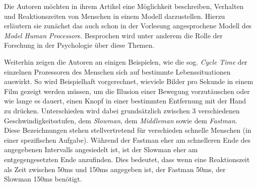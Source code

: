 \documentclass[a4paper,10pt]{article}
\begin{document}
\kopf
\renewcommand{\figurename}{Figure}

Die Autoren möchten in ihrem Artikel eine Möglichkeit beschreiben, Verhalten und Reaktionszeiten von Menschen in einem Modell darzustellen. Hierzu erläutern sie zunächst das auch schon in der Vorlesung angesprochene Modell des \textit{Model Human Processor}s. Besprochen wird unter anderem die Rolle der Forschung in der Psychologie über diese Themen.

Weiterhin zeigen die Autoren an einigen Beispielen, wie die sog. \textit{Cycle Time} der einzelnen Prozessoren des Menschen sich auf bestimmte Lebenssituationen auswirkt. So wird Beispielhaft vorgerechnet, wieviele Bilder pro Sekunde in einem Film gezeigt werden müssen, um die Illusion einer Bewegung vorzutäuschen oder wie lange es dauert, einen Knopf in einer bestimmten Entfernung mit der Hand zu drücken. Unterschieden wird dabei grundsätzlich zwischen 3 verschiedenen Geschwindigkeitsstufen, dem \textit{Slowman}, dem \textit{Middleman} sowie dem \textit{Fastman}. Diese Bezeichnungen stehen stellvertretend für verschieden schnelle Menschen (in einer spezifischen Aufgabe). Während der Fastman eher am schnelleren Ende des angegebenen Intervalls angesiedelt ist, ist der Slowman eher am entgegengesetzten Ende anzufinden. Dies bedeutet, dass wenn eine Reaktionszeit als Zeit zwischen 50ms und 150ms angegeben ist, der Fastman 50ms, der Slowman 150ms benötigt.
\end{document}
